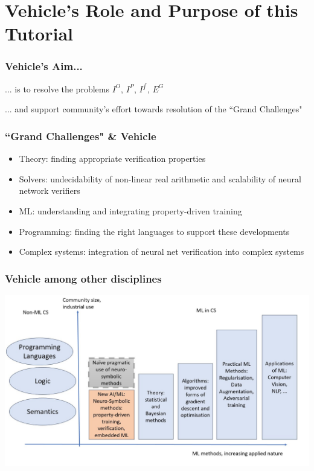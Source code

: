 \documentclass[t,compress,aspectratio=169]{beamer}
\begin{document}
\section{\textbf{Vehicle}'s Role and Purpose of this Tutorial}

\begin{frame}
\frametitle{\textbf{Vehicle}'s Aim...}

\alert{... is to resolve the problems $I^O$, $I^P$, $I^{\int}$, $E^G$}
\pause

... and support community's effort towards resolution of the ``Grand Challenges"

\end{frame}

  \begin{frame}
  \frametitle{``Grand Challenges"  \& \textbf{Vehicle}}
  \footnotesize{
  \begin{itemize}
  \item Theory: finding appropriate verification properties
\item  Solvers: undecidability of non-linear real arithmetic  and scalability of neural network verifiers
\item \alert{ML: understanding and integrating property-driven training}
\item \alert{Programming: finding the right languages to support these developments}
\item \alert{Complex systems: integration of neural net verification into complex systems}
  \end{itemize}}

\end{frame}

\begin{frame}
\frametitle{\textbf{Vehicle} among other disciplines}
  \begin{center}
  \includegraphics[scale=.32]{img/Slide1.jpg}
  \end{center}
\end{frame}
\end{document}
